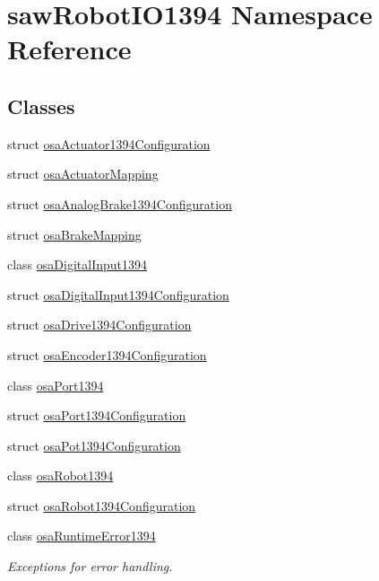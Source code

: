 \hypertarget{namespacesaw_robot_i_o1394}{}\section{saw\+Robot\+I\+O1394 Namespace Reference}
\label{namespacesaw_robot_i_o1394}
\subsection*{Classes}
\begin{DoxyCompactItemize}
\item 
struct \hyperlink{structsaw_robot_i_o1394_1_1osa_actuator1394_configuration}{osa\+Actuator1394\+Configuration}
\item 
struct \hyperlink{structsaw_robot_i_o1394_1_1osa_actuator_mapping}{osa\+Actuator\+Mapping}
\item 
struct \hyperlink{structsaw_robot_i_o1394_1_1osa_analog_brake1394_configuration}{osa\+Analog\+Brake1394\+Configuration}
\item 
struct \hyperlink{structsaw_robot_i_o1394_1_1osa_brake_mapping}{osa\+Brake\+Mapping}
\item 
class \hyperlink{classsaw_robot_i_o1394_1_1osa_digital_input1394}{osa\+Digital\+Input1394}
\item 
struct \hyperlink{structsaw_robot_i_o1394_1_1osa_digital_input1394_configuration}{osa\+Digital\+Input1394\+Configuration}
\item 
struct \hyperlink{structsaw_robot_i_o1394_1_1osa_drive1394_configuration}{osa\+Drive1394\+Configuration}
\item 
struct \hyperlink{structsaw_robot_i_o1394_1_1osa_encoder1394_configuration}{osa\+Encoder1394\+Configuration}
\item 
class \hyperlink{classsaw_robot_i_o1394_1_1osa_port1394}{osa\+Port1394}
\item 
struct \hyperlink{structsaw_robot_i_o1394_1_1osa_port1394_configuration}{osa\+Port1394\+Configuration}
\item 
struct \hyperlink{structsaw_robot_i_o1394_1_1osa_pot1394_configuration}{osa\+Pot1394\+Configuration}
\item 
class \hyperlink{classsaw_robot_i_o1394_1_1osa_robot1394}{osa\+Robot1394}
\item 
struct \hyperlink{structsaw_robot_i_o1394_1_1osa_robot1394_configuration}{osa\+Robot1394\+Configuration}
\item 
class \hyperlink{classsaw_robot_i_o1394_1_1osa_runtime_error1394}{osa\+Runtime\+Error1394}
\begin{DoxyCompactList}\small\item\em Exceptions for error handling. \end{DoxyCompactList}\end{DoxyCompactItemize}
